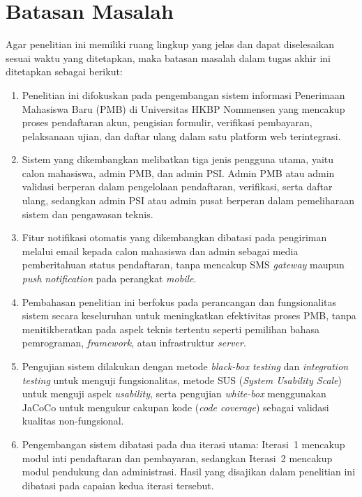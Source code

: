 \section{Batasan Masalah} \label{I.Batasan}
Agar penelitian ini memiliki ruang lingkup yang jelas dan dapat diselesaikan sesuai waktu yang ditetapkan, maka batasan masalah dalam tugas akhir ini ditetapkan sebagai berikut:\par

\begin{enumerate}[noitemsep]
	\item Penelitian ini difokuskan pada pengembangan sistem informasi Penerimaan Mahasiswa Baru (PMB) di Universitas HKBP Nommensen yang mencakup proses pendaftaran akun, pengisian formulir, verifikasi pembayaran, pelaksanaan ujian, dan daftar ulang dalam satu platform web terintegrasi.
	\item Sistem yang dikembangkan melibatkan tiga jenis pengguna utama, yaitu calon mahasiswa, admin PMB, dan admin PSI. Admin PMB atau admin validasi berperan dalam pengelolaan pendaftaran, verifikasi, serta daftar ulang, sedangkan admin PSI atau admin pusat berperan dalam pemeliharaan sistem dan pengawasan teknis.
	\item Fitur notifikasi otomatis yang dikembangkan dibatasi pada pengiriman melalui email kepada calon mahasiswa dan admin sebagai media pemberitahuan status pendaftaran, tanpa mencakup SMS \textit{gateway} maupun \textit{push notification} pada perangkat \textit{mobile}.
	\item Pembahasan penelitian ini berfokus pada perancangan dan fungsionalitas sistem secara keseluruhan untuk meningkatkan efektivitas proses PMB, tanpa menitikberatkan pada aspek teknis tertentu seperti pemilihan bahasa pemrograman, \textit{framework}, atau infrastruktur \textit{server}.
	\item Pengujian sistem dilakukan dengan metode \textit{black-box testing} dan \textit{integration testing} untuk menguji fungsionalitas, metode SUS (\textit{System Usability Scale}) untuk menguji aspek \textit{usability}, serta pengujian \textit{white-box} menggunakan JaCoCo untuk mengukur cakupan kode (\textit{code coverage}) sebagai validasi kualitas non-fungsional.
	\item Pengembangan sistem dibatasi pada dua iterasi utama: Iterasi~1 mencakup modul inti pendaftaran dan pembayaran, sedangkan Iterasi~2 mencakup modul pendukung dan administrasi. Hasil yang disajikan dalam penelitian ini dibatasi pada capaian kedua iterasi tersebut.
\end{enumerate}

